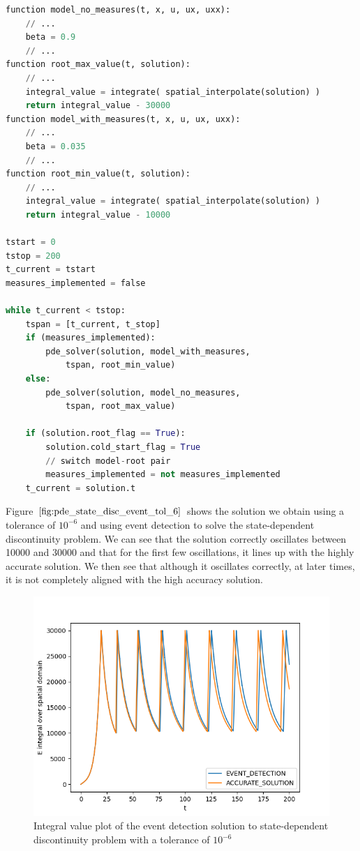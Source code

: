 \begin{minipage}{\linewidth}
\begin{lstlisting}[language=Python]
function model_no_measures(t, x, u, ux, uxx):
	// ...
	beta = 0.9
	// ...
function root_max_value(t, solution):
	// ...
	integral_value = integrate( spatial_interpolate(solution) )
	return integral_value - 30000
function model_with_measures(t, x, u, ux, uxx):
	// ...
	beta = 0.035
	// ...
function root_min_value(t, solution):
	// ...
	integral_value = integrate( spatial_interpolate(solution) )
	return integral_value - 10000

tstart = 0
tstop = 200
t_current = tstart
measures_implemented = false

while t_current < tstop:
	tspan = [t_current, t_stop]
	if (measures_implemented):
		pde_solver(solution, model_with_measures, 
			tspan, root_min_value)
	else:
		pde_solver(solution, model_no_measures, 
			tspan, root_max_value)
	
	if (solution.root_flag == True):
		solution.cold_start_flag = True
		// switch model-root pair
		measures_implemented = not measures_implemented
	t_current = solution.t

\end{lstlisting}
\end{minipage}

Figure $\ref{fig:pde_state_disc_event_tol_6}$ shows the solution we obtain using a tolerance of $10^{-6}$ and using event detection to solve the state-dependent discontinuity problem. We can see that the solution correctly oscillates between 10000 and 30000 and that for the first few oscillations, it lines up with the highly accurate solution. We then see that although it oscillates correctly, at later times, it is not completely aligned with the high accuracy solution. 

\begin{figure}[H]
\centering
\includegraphics[width=0.7\linewidth]{./figures/pde_state_disc_event_tol_6}
\caption{Integral value plot of the event detection solution to state-dependent discontinuity problem with a tolerance of $10^{-6}$}
\label{fig:pde_state_disc_event_tol_6}
\end{figure}

